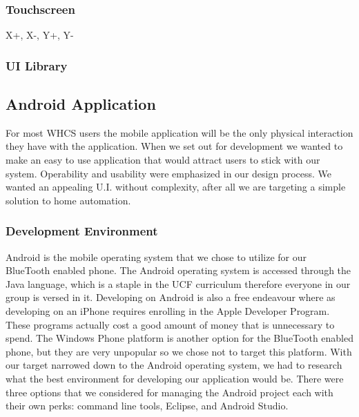 \subsubsection{Touchscreen}

X+, X-, Y+, Y-

\subsubsection{UI Library}

\subsection{Android Application} For most WHCS users the mobile application
will be the only physical interaction they have with the application. When we
set out for development we wanted to make an easy to use application that would
attract users to stick with our system.  Operability and usability were
emphasized in our design process. We wanted an appealing U.I. without
complexity, after all we are targeting a simple solution to home automation.

\subsubsection{Development Environment} Android is the mobile operating system
that we chose to utilize for our BlueTooth enabled phone. The Android operating
system is accessed through the Java language, which is a staple in the UCF
curriculum therefore everyone in our group is versed in it. Developing on
Android is also a free endeavour where as developing on an iPhone requires
enrolling in the Apple Developer Program. These programs actually cost a good
amount of money that is unnecessary to spend. The Windows Phone platform is
another option for the BlueTooth enabled phone, but they are very unpopular so
we chose not to target this platform. With our target narrowed down to the
Android operating system, we had to research what the best environment for
developing our application would be. There were three options that we
considered for managing the Android project each with their own perks: command
line tools, Eclipse, and Android Studio.

